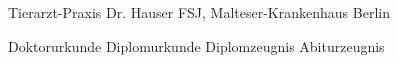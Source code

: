 \documentclass[12pt,parskip=half-]{scrartcl}
\begin{document}

\begin{Anlagenverzeichnis}
    \begin{Auflistung}
        \punkt Tierarzt-Praxis Dr. Hauser
        \punkt FSJ, Malteser-Krankenhaus Berlin
    \end{Auflistung}

    \begin{Auflistung}
        \punkt Doktorurkunde
        \punkt Diplomurkunde
        \punkt Diplomzeugnis
        \punkt Abiturzeugnis
    \end{Auflistung}
\end{Anlagenverzeichnis}


\end{document}
